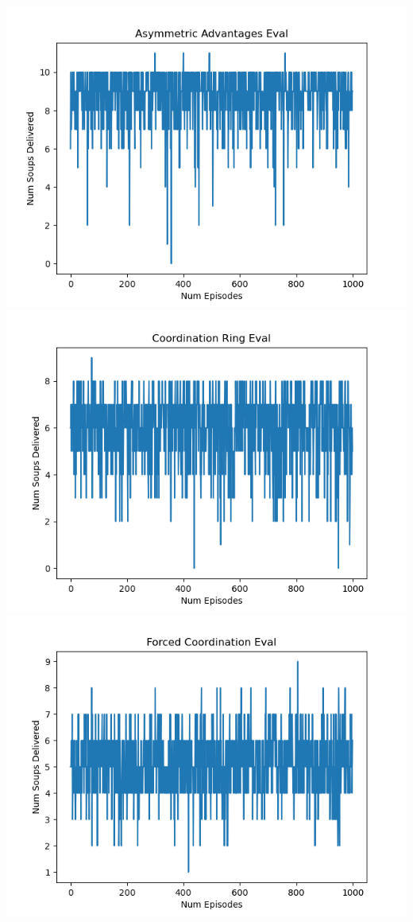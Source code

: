 \documentclass[conference]{IEEEtran}
\begin{document}
\includegraphics[scale=0.5]{asym_eval.png}
\includegraphics[scale=0.5]{coordring_eval.png}
\includegraphics[scale=0.5]{forcedcoord_eval.png}
\end{document}
